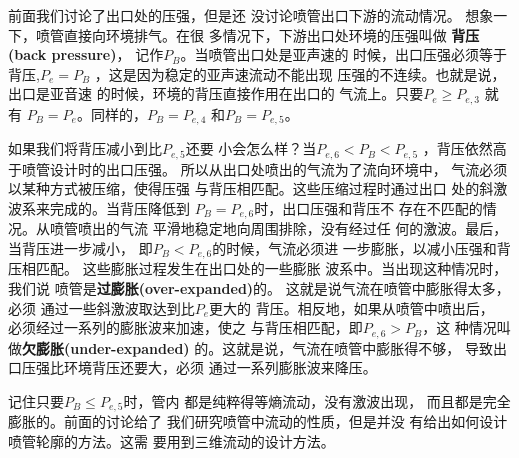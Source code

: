 前面我们讨论了出口处的压强，但是还
没讨论喷管出口下游的流动情况。
想象一下，喷管直接向环境排气。在很
多情况下，下游出口处环境的压强叫做
{\bfseries 背压(back pressure)}，
记作$P_B $。当喷管出口处是亚声速的
时候，出口压强必须等于背压,$P_e=P_B$
，这是因为稳定的亚声速流动不能出现
压强的不连续。也就是说，出口是亚音速
的时候，环境的背压直接作用在出口的
气流上。只要$P_e\geq P_{e,3}$ 就有
$P_B=P_e $。同样的，$P_B=P_{e,4} $
和$P_B=P_{e,5} $。

如果我们将背压减小到比$P_{e,5} $还要
小会怎么样？当$P_{e,6}<P_B<P_{e,5}$
，背压依然高于喷管设计时的出口压强。
所以从出口处喷出的气流为了流向环境中，
气流必须以某种方式被压缩，使得压强
与背压相匹配。这些压缩过程时通过出口
处的斜激波系来完成的。当背压降低到
$P_B=P_{e,6} $时，出口压强和背压不
存在不匹配的情况。从喷管喷出的气流
平滑地稳定地向周围排除，没有经过任
何的激波。最后，当背压进一步减小，
即$P_B<P_{e,6} $的时候，气流必须进
一步膨胀，以减小压强和背压相匹配。
这些膨胀过程发生在出口处的一些膨胀
波系中。当出现这种情况时，我们说
喷管是{\bfseries 过膨胀(over-expanded)}的。
这就是说气流在喷管中膨胀得太多，必须
通过一些斜激波取达到比$P_e$更大的
背压。相反地，如果从喷管中喷出后，
必须经过一系列的膨胀波来加速，使之
与背压相匹配，即$P_{e,6}>P_B $，这
种情况叫做{\bfseries 欠膨胀(under-expanded)}
的。这就是说，气流在喷管中膨胀得不够，
导致出口压强比环境背压还要大，必须
通过一系列膨胀波来降压。

记住只要$P_B\leq P_{e,5}$时，管内
都是纯粹得等熵流动，没有激波出现，
而且都是完全膨胀的。前面的讨论给了
我们研究喷管中流动的性质，但是并没
有给出如何设计喷管轮廓的方法。这需
要用到三维流动的设计方法。

